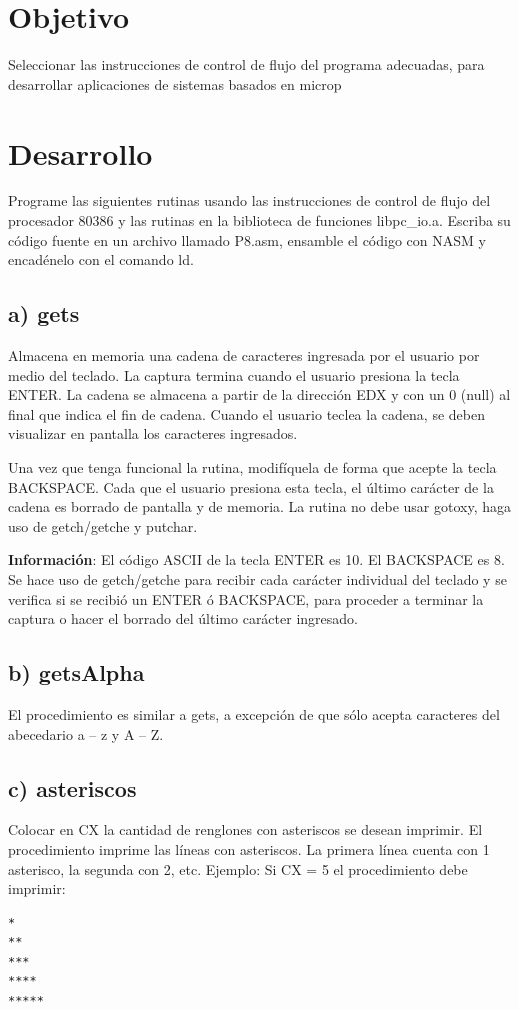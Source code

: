 \documentclass[12pt]{article}
\begin{document}
\section*{Objetivo}
\label{sec:orgbb8453b}
Seleccionar las instrucciones de control de flujo del programa adecuadas, para
desarrollar aplicaciones de sistemas basados en microp

\section*{Desarrollo}
\label{sec:org0966e07}
Programe las siguientes rutinas usando las instrucciones de control de flujo del
procesador 80386 y las rutinas en la biblioteca de funciones libpc\_io.a. Escriba su
código fuente en un archivo llamado P8.asm, ensamble el código con NASM y
encadénelo con el comando ld.

\subsection*{a) gets}
\label{sec:org6352f41}
Almacena en memoria una cadena de caracteres ingresada por el usuario por medio
del teclado. La captura termina cuando el usuario presiona la tecla ENTER. La 
cadena se almacena a partir de la dirección EDX y con un 0 (null) al final que 
indica el fin de cadena. Cuando el usuario teclea la cadena, se deben 
visualizar en pantalla los caracteres ingresados.

Una vez que tenga funcional la rutina, modifíquela de forma que acepte la tecla
BACKSPACE. Cada que el usuario presiona esta tecla, el último carácter de la 
cadena es borrado de pantalla y de memoria. La rutina no debe usar gotoxy, 
haga uso de getch/getche y putchar.

\textbf{Información}: El código ASCII de la tecla ENTER es 10. El BACKSPACE es 8. Se 
hace uso de getch/getche para recibir cada carácter individual del teclado y 
se verifica si se recibió un ENTER ó BACKSPACE, para proceder a terminar la 
captura o hacer el borrado del último carácter ingresado.

\subsection*{b) getsAlpha}
\label{sec:org37636fe}
El procedimiento es similar a gets, a excepción de que sólo acepta caracteres
del abecedario a – z y A – Z.

\subsection*{c) asteriscos}
\label{sec:org1c89f5a}
Colocar en CX la cantidad de renglones con asteriscos se desean imprimir. El
procedimiento imprime las líneas con asteriscos. La primera línea cuenta con 
1 asterisco, la segunda con 2, etc. Ejemplo: Si CX = 5 el procedimiento debe 
imprimir:

\begin{verbatim}
*
**
***
****
*****
\end{verbatim}
\end{document}
